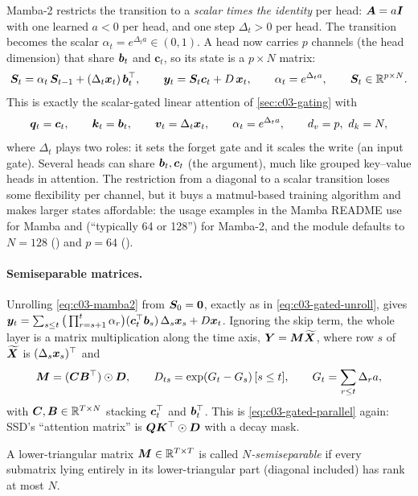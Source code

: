 Mamba-2 \citep{dao2024ssd} restricts the transition to a \emph{scalar times the identity} per
head: $\bm{A}=a\bm{I}$ with one learned $a<0$ per head, and one step $\Delta_t>0$ per head. The
transition becomes the scalar $\alpha_t=e^{\Delta_t a}\in(0,1)$. A head now carries $p$ channels
(the head dimension) that share $\bm{b}_t$ and $\bm{c}_t$, so its state is a $p\times N$ matrix:
\begin{equation}\label{eq:c03-mamba2}
  \bm{S}_t=\alpha_t\,\bm{S}_{t-1}+(\Delta_t\bm{x}_t)\,\bm{b}_t^{\top},\qquad
  \bm{y}_t=\bm{S}_t\bm{c}_t+D\,\bm{x}_t,\qquad \alpha_t=e^{\Delta_t a},\qquad \bm{S}_t\in\mathbb{R}^{p\times N}.
\end{equation}
This is exactly the scalar-gated linear attention of \cref{sec:c03-gating} with
\[
  \vq_t=\bm{c}_t,\qquad \vk_t=\vb_t,\qquad \vv_t=\Delta_t\vx_t,\qquad \alpha_t=e^{\Delta_t a},\qquad d_v=p,\ d_k=N,
\]
where $\Delta_t$ plays two roles: it sets the forget gate and it scales the write (an input
gate). Several heads can share $\bm{b}_t,\bm{c}_t$ (the  argument), much like grouped
key--value heads in attention. The restriction from a diagonal to a scalar transition loses
some flexibility per channel, but it buys a matmul-based training algorithm and makes larger
states affordable: the usage examples in the Mamba README use  for Mamba and
 (``typically 64 or 128'') for Mamba-2, and the  module defaults to
$N=128$ () and $p=64$ ().

\paragraph{Semiseparable matrices.}
Unrolling \cref{eq:c03-mamba2} from $\bm{S}_0=\bm0$, exactly as in \cref{eq:c03-gated-unroll},
gives $\bm{y}_t=\sum_{s\le t}\big(\prod_{r=s+1}^{t}\alpha_r\big)(\bm{c}_t^{\top}\bm{b}_s)\,\Delta_s\bm{x}_s+D\bm{x}_t$.
Ignoring the skip term, the whole layer is a matrix multiplication along the time axis,
$\bm{Y}=\bm{M}\widetilde{\bm{X}}$, where row $s$ of $\widetilde{\bm{X}}$ is $(\Delta_s\bm{x}_s)^{\top}$ and
\begin{equation}\label{eq:c03-ssd-matrix}
  \bm{M}=(\bm{C}\bm{B}^{\top})\odot\bm{D},\qquad D_{ts}=\exp(G_t-G_s)\,[s\le t],\qquad G_t=\sum_{r\le t}\Delta_ra ,
\end{equation}
with $\bm{C},\bm{B}\in\mathbb{R}^{T\times N}$ stacking $\bm{c}_t^{\top}$ and $\bm{b}_t^{\top}$. This is
\cref{eq:c03-gated-parallel} again: SSD's ``attention matrix'' is $\bm{Q}\bm{K}^{\top}\odot\bm{D}$ with a decay
mask.

\begin{definition}
A lower-triangular matrix $\bm{M}\in\mathbb{R}^{T\times T}$ is called \emph{$N$-semiseparable} if
every submatrix lying entirely in its lower-triangular part (diagonal included) has rank at
most $N$.
\end{definition}

